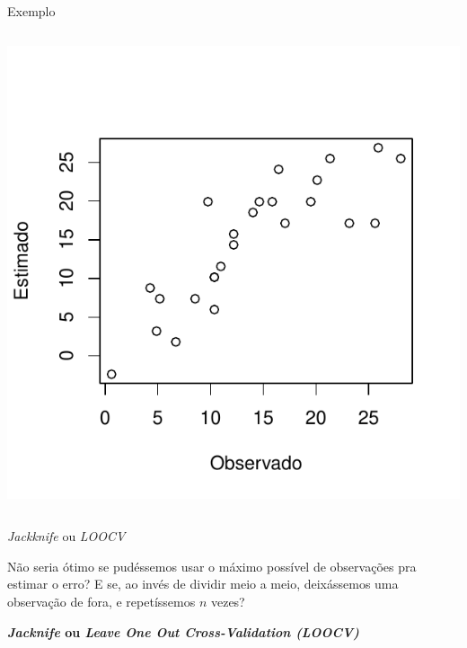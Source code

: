 \documentclass{beamer}\usepackage[]{graphicx}\usepackage[]{color}
\newenvironment{knitrout}{}{} %
\renewenvironment{knitrout}{\setlength{\topsep}{0mm}}{}
\begin{document}
\begin{frame}[fragile]{Exemplo}
\begin{columns}[c]
\begin{knitrout}
\includegraphics[width=.7\linewidth]{figure/v8-2} 

\end{knitrout}

\end{columns}

\end{frame}

\begin{frame}{\emph{Jackknife} ou \emph{LOOCV}}

Não seria ótimo se pudéssemos usar o máximo possível de observações pra estimar o erro? \pause
\vfill
E se, ao invés de dividir meio a meio, deixássemos uma observação de fora, e repetíssemos $n$ vezes? \pause

\vfill
\textbf{\emph{Jacknife} ou \emph{Leave One Out Cross-Validation (LOOCV)}} 

\end{frame}
\end{document}
